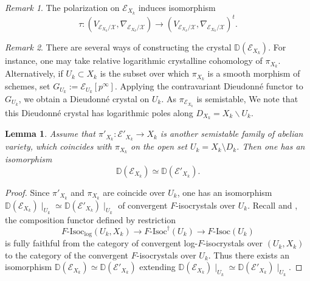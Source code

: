 \documentclass[12pt,twoside]{book}
\theoremstyle{plain}
\newtheorem{lemma}[lemma]{Lemma}
\theoremstyle{definition}
\theoremstyle{remark}
\newtheorem{remark}[remark]{Remark}
\numberwithin{equation}{section}
\begin{document}
\begin{remark} The polarization on $\mathcal E_{X_k}$ induces isomorphism
\[\tau\colon (V_{\mathcal E_{{X_k}}/\mathcal X},\nabla_{\mathcal E_{{X_k}}/\mathcal X}) \rightarrow (V_{\mathcal E_{{X_k}}/\mathcal X},\nabla_{\mathcal E_{{X_k}}/\mathcal X})^t.\]
\end{remark}

\begin{remark}
There are several ways of constructing the crystal $\mathbb D(\mathcal E_{{X_k}})$. For instance, one may take relative logarithmic crystalline cohomology of $\pi_{{X_k}}$. Alternatively, if ${U_k}\subset {X_k}$ is the subset over which $\pi_{{X_k}}$ is a smooth morphism of schemes, set $G_{{U_k}}:=\mathcal E_{{U_k}}[p^{\infty}]$. Applying the contravariant Dieudonn\'e functor to $G_{{U_k}}$, we obtain a Dieudonn\'e crystal on ${U_k}$. As $\pi_{\mathcal E_{{X_k}}}$ is semistable, We note that this Dieudonn\'e crystal has logarithmic poles along $D_{{X_k}}={X_k}\backslash {U_k}$.
\end{remark}

\begin{lemma}
\label{independence}
Assume that $\pi'_{X_k}\colon \mathcal E'_{{X_k}}\rightarrow {X_k}$
is another semistable family of abelian variety, which coincides with $\pi_{{X_k}}$ on the open set ${U_k}={X_k}\setminus {D_k}$. Then one has an isomorphism
\[\mathbb D(\mathcal E_{{X_k}}) \simeq \mathbb D(\mathcal E'_{{X_k}}).\]
\end{lemma}

\begin{proof}
Since $\pi'_{X_k}$ and $\pi_{X_k}$ are coincide over $U_k$, one has an isomorphism $\mathbb D(\mathcal E_{{X_k}})\mid_{U_k} \simeq \mathbb D(\mathcal E'_{{X_k}})\mid_{U_k}$ of convergent $F$-isocrystals over $U_k$. Recall \cite[Theorem 5.2.1]{Ked07} and \cite[Theorem 6.4.5]{Ked07}, the composition functor defined by restriction
\[F\textrm{-Isoc}_{\log}(U_k,X_k) \rightarrow F\textrm{-Isoc}^\dagger(U_k) \rightarrow F\textrm{-Isoc}(U_k)\]
is fully faithful from the category of convergent log-$F$-isocrystals over $(U_k,X_k)$ to the category of the convergent $F$-isocrystals over $U_k$. Thus there exists an isomorphism $\mathbb D(\mathcal E_{{X_k}}) \simeq \mathbb D(\mathcal E'_{{X_k}})$ extending $\mathbb D(\mathcal E_{{X_k}})\mid_{U_k} \simeq \mathbb D(\mathcal E'_{{X_k}})\mid_{U_k}$.
\end{proof}
\end{document}
